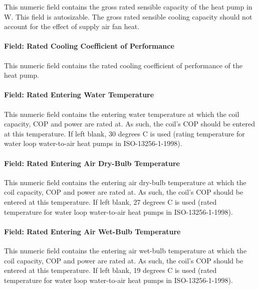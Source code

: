 This numeric field contains the gross rated sensible capacity of the heat pump in W. This field is autosizable. The gross rated sensible cooling capacity should not account for the effect of supply air fan heat.

\paragraph{Field: Rated Cooling Coefficient of Performance}\label{field-rated-cooling-coefficient-of-performance}

This numeric field contains the rated cooling coefficient of performance of the heat pump.

\paragraph{Field: Rated Entering Water Temperature}\label{field-rated-entering-water-temperature}

This numeric field contains the entering water temperature at which the coil capacity, COP and power are rated at. As such, the coil's COP should be entered at this temperature. If left blank, 30 degrees C is used (rating temperature for water loop water-to-air heat pumps in ISO-13256-1-1998).

\paragraph{Field: Rated Entering Air Dry-Bulb Temperature}\label{field-rated-entering-air-dry-bulb-temperature}

This numeric field contains the entering air dry-bulb temperature at which the coil capacity, COP and power are rated at. As such, the coil's COP should be entered at this temperature. If left blank, 27 degrees C is used (rated temperature for water loop water-to-air heat pumps in ISO-13256-1-1998).

\paragraph{Field: Rated Entering Air Wet-Bulb Temperature}\label{field-rated-entering-air-wet-bulb-temperature}

This numeric field contains the entering air wet-bulb temperature at which the coil capacity, COP and power are rated at. As such, the coil's COP should be entered at this temperature. If left blank, 19 degrees C is used (rated temperature for water loop water-to-air heat pumps in ISO-13256-1-1998).

